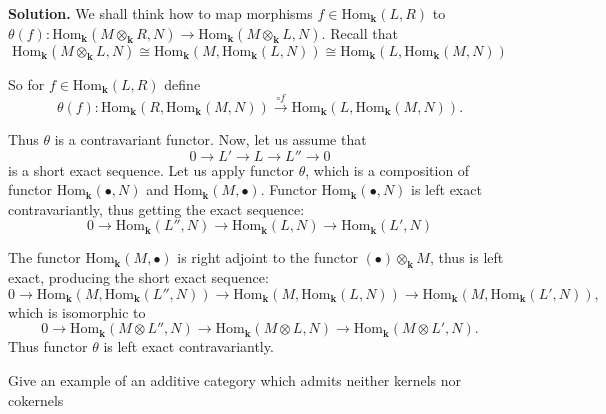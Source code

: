 \documentclass{category-template}
\begin{document}
\textbf{Solution.} We shall think how to map morphisms $f \in
\text{Hom}_{\mathbf{k}}(L, R)$ to $\theta(f): \text{Hom}_{\mathbf{k}}(M
\otimes_{\mathbf{k}} R, N) \to \text{Hom}_{\mathbf{k}}(M \otimes_{\mathbf{k}} L,
N)$. Recall that 
\begin{equation*}
    \text{Hom}_{\mathbf{k}}(M \otimes_{\mathbf{k}} L, N) \cong \text{Hom}_{\mathbf{k}}(M, \text{Hom}_{\mathbf{k}}(L, N)) \cong \text{Hom}_{\mathbf{k}}(L, \text{Hom}_{\mathbf{k}}(M, N))
\end{equation*}

So for $f \in \text{Hom}_{\mathbf{k}}(L, R)$ define 
\begin{equation*}
    \theta(f): \text{Hom}_{\mathbf{k}}(R, \text{Hom}_{\mathbf{k}}(M, N)) \xrightarrow{\circ f} \text{Hom}_{\mathbf{k}}(L, \text{Hom}_{\mathbf{k}}(M, N)).
\end{equation*}

Thus $\theta$ is a contravariant functor. Now, let us assume that
\begin{equation*}
    0 \to L' \to L \to L'' \to 0
\end{equation*}
is a short exact sequence. Let us apply functor $\theta$, which is a composition of
functor $\text{Hom}_{\mathbf{k}}(\bullet, N)$ and $\text{Hom}_{\mathbf{k}}(M,
\bullet)$. Functor $\text{Hom}_{\mathbf{k}}(\bullet, N)$ is left exact 
contravariantly, thus getting the exact sequence:
\begin{equation*}
    0 \to \text{Hom}_{\mathbf{k}}(L'', N) \to \text{Hom}_{\mathbf{k}}(L, N) \to \text{Hom}_{\mathbf{k}}(L', N)
\end{equation*}

The functor $\text{Hom}_{\mathbf{k}}(M, \bullet)$ is right adjoint to the 
functor $(\bullet) \otimes_{\mathbf{k}} M$, thus is left exact, producing the short exact sequence:
\begin{equation*}
    0 \to \text{Hom}_{\mathbf{k}}(M, \text{Hom}_{\mathbf{k}}(L'', N)) \to \text{Hom}_{\mathbf{k}}(M, \text{Hom}_{\mathbf{k}}(L, N)) \to \text{Hom}_{\mathbf{k}}(M, \text{Hom}_{\mathbf{k}}(L', N)),
\end{equation*}
which is isomorphic to
\begin{equation*}
    0 \to \text{Hom}_{\mathbf{k}}(M \otimes L'', N) \to \text{Hom}_{\mathbf{k}}(M \otimes L, N) \to \text{Hom}_{\mathbf{k}}(M \otimes L', N).
\end{equation*}
Thus functor $\theta$ is left exact contravariantly.

\begin{problem}
Give an example of an additive category which admits neither kernels nor
cokernels
\end{problem}
\end{document}
